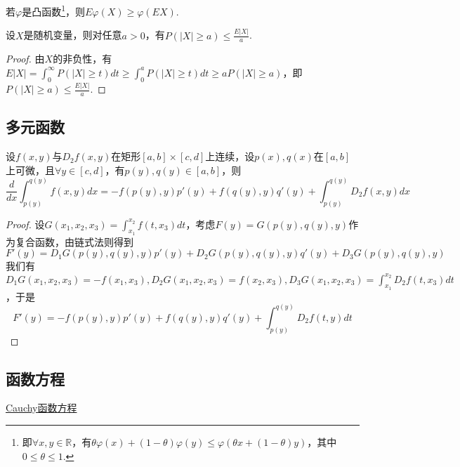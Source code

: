 \begin{theorem}[Jensen不等式]\label{Jensen不等式}
    若$\varphi$是凸函数\footnote{即$\forall x,y\in \mathbb{R}$，有$\theta \varphi(x)+(1-\theta)\varphi(y)\le \varphi(\theta x+(1-\theta)y)$，其中$0\le \theta\le 1$.}，则$ E\varphi(X)\ge \varphi(EX)$.
\end{theorem}

\begin{theorem}[Markov不等式]\label{Markov不等式}
    设$X$是随机变量，则对任意$a>0$，有$P(\lvert X\rvert\ge a)\le \frac{E\lvert X\rvert}{a}$.
\end{theorem}

\begin{proof}
    由$X$的非负性，有$E\lvert X\rvert=\int_0^{\infty}P(\lvert X\rvert\ge t)dt\ge \int_0^aP(\lvert X\rvert\ge t)dt\ge aP(\lvert X\rvert\ge a)$，即$P(\lvert X\rvert\ge a)\le \frac{E\lvert X\rvert}{a}$.
\end{proof}

\subsection{多元函数}

\begin{theorem}[含参积分求导公式]
    设$f(x,y)$与$D_2f(x,y)$在矩形$[a,b]\times [c,d]$上连续，设$p(x),q(x)$在$[a,b]$上可微，且$\forall y\in[c,d]$，有$p(y),q(y)\in [a,b]$，则
    $$
    \frac{d}{dx}\int_{p(y)}^{q(y)}f(x,y)dx=-f(p(y),y)p'(y)+f(q(y),y)q'(y)+\int_{p(y)}^{q(y)}D_2f(x,y)dx
    $$
\end{theorem}

\begin{proof}
    设$G(x_1,x_2,x_3)=\int_{x_1}^{x_2}f(t,x_3)dt$，考虑$F(y)=G(p(y),q(y),y)$作为复合函数，由链式法则得到
    $$
    F'(y)=D_1G(p(y),q(y),y)p'(y)+D_2G(p(y),q(y),y)q'(y)+D_3G(p(y),q(y),y)
    $$
    我们有$D_1G(x_1,x_2,x_3)=-f(x_1,x_3),D_2G(x_1,x_2,x_3)=f(x_2,x_3),D_3G(x_1,x_2,x_3)=\int_{x_1}^{x_2}D_2f(t,x_3)dt$，于是
    $$
    F'(y)=-f(p(y),y)p'(y)+f(q(y),y)q'(y)+\int_{p(y)}^{q(y)}D_2f(t,y)dt
    $$
\end{proof}

\subsection{函数方程}

\href{https://easygl1der.github.io/MyWebsite/Book/Functional%20equations%20and%20inequalities%20with%20applications%20(Palaniappan%20Kannappan%20(auth.))%20(Z-Library).pdf#page=24}{Cauchy函数方程}


